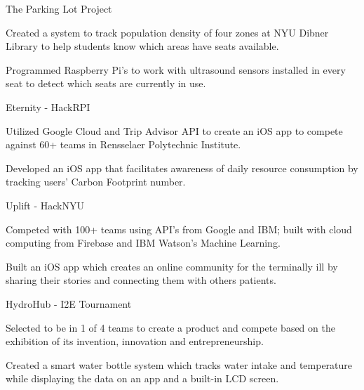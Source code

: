 
\begin{cventries}
  \cventry
    {} %
    {The Parking Lot Project} %
    {} %
    {} %
    {
      \begin{cvitems} %
        \item {Created a system to track population density of four zones at NYU Dibner Library to help students know which areas have seats available.}
		\item {Programmed Raspberry Pi's to work with ultrasound sensors installed in every seat to detect which seats are currently in use.}
      \end{cvitems}
    }
    
  \cventry
    {} %
    {Eternity - HackRPI} %
    {} %
    {} %
    {
      \begin{cvitems} %
        \item {Utilized Google Cloud and Trip Advisor API to create an iOS app to compete against 60+ teams in Rensselaer Polytechnic Institute.}
		\item {Developed an iOS app that facilitates awareness of daily resource consumption by tracking users' Carbon Footprint number.}
      \end{cvitems}
    }

  \cventry
    {} %
    {Uplift - HackNYU} %
    {} %
    {} %
    {
      \begin{cvitems} %
      	\item {Competed with 100+ teams using API’s from Google and IBM; built with cloud computing from Firebase and IBM Watson's Machine Learning.}
		\item {Built an iOS app which creates an online community for the terminally ill by sharing their stories and connecting them with others patients.}
      \end{cvitems}
    }
    
    \cventry
    {} %
    {HydroHub - I2E Tournament} %
    {} %
    {} %
    {
      \begin{cvitems} %
        \item {Selected to be in 1 of 4 teams to create a product and compete based on the exhibition of its invention, innovation and entrepreneurship.}
		\item {Created a smart water bottle system which tracks water intake and temperature while displaying the data on an app and a built-in LCD screen.}
      \end{cvitems}
    }
    

\end{cventries}
